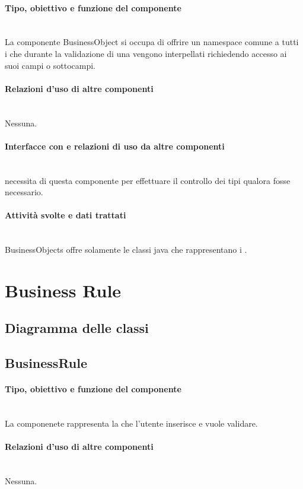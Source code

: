 \documentclass[11pt,titlepage,a4paper]{report}
\begin{document}
\paragraph{Tipo, obiettivo e funzione del componente}\\
La componente BusinessObject si occupa di offrire un namespace comune a tutti i \bos che durante la validazione di una \br vengono interpellati richiedendo accesso ai suoi campi o sottocampi.
\paragraph{Relazioni d'uso di altre componenti}\\
Nessuna.
\paragraph{Interfacce con e relazioni di uso da altre componenti}\\
\brp necessita di questa componente per effettuare il controllo dei tipi qualora fosse necessario.
\paragraph{Attivit\`a svolte e dati trattati}\\
BusinessObjects offre solamente le classi java che rappresentano i \bos.

\section{Business Rule}
\subsection{Diagramma delle classi}
\subsection{BusinessRule}
\paragraph{Tipo, obiettivo e funzione del componente}\\
La componenete \BR rappresenta la \br che l'utente inserisce e vuole validare.
\paragraph{Relazioni d'uso di altre componenti}\\
Nessuna.
\end{document}
